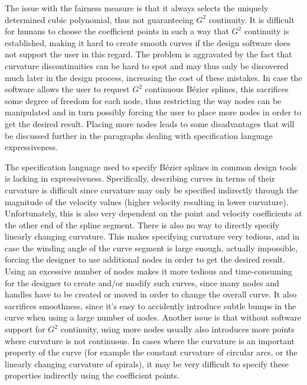 \documentclass[a4paper]{article}
\begin{document}
				The issue with the fairness measure is that it always selects the uniquely determined cubic polynomial, thus not guaranteeing \(G^2\) continuity. It is difficult for humans to choose the coefficient points in such a way that \(G^2\) continuity is established, making it hard to create smooth curves if the design software does not support the user in this regard. The problem is aggravated by the fact that curvature discontinuities can be hard to spot and may thus only be discovered much later in the design process, increasing the cost of these mistakes. In case the software allows the user to request \(G^2\) continuous Bézier splines, this sacrifices some degree of freedom for each node, thus restricting the way nodes can be manipulated and in turn possibly forcing the user to place more nodes in order to get the desired result. Placing more nodes leads to some disadvantages that will be discussed further in the paragraphs dealing with specification language expressiveness.

				The specification language used to specify Bézier splines in common design tools is lacking in expressiveness. Specifically, describing curves in terms of their curvature is difficult since curvature may only be specified indirectly through the magnitude of the velocity values (higher velocity resulting in lower curvature). Unfortunately, this is also very dependent on the point and velocity coefficients at the other end of the spline segment. There is also no way to directly specify linearly changing curvature. This makes specifying curvature very tedious, and in case the winding angle of the curve segment is large enough, actually impossible, forcing the designer to use additional nodes in order to get the desired result. Using an excessive number of nodes makes it more tedious and time-consuming for the designer to create and/or modify such curves, since many nodes and handles have to be created or moved in order to change the overall curve. It also sacrifices smoothness, since it's easy to accidently introduce subtle bumps in the curve when using a large number of nodes. Another issue is that without software support for \(G^2\) continuity, using more nodes usually also introduces more points where curvature is not continuous. In cases where the curvature is an important property of the curve (for example the constant curvature of circular arcs, or the linearly changing curvature of spirals), it may be very difficult to specify these properties indirectly using the coefficient points.
\end{document}
